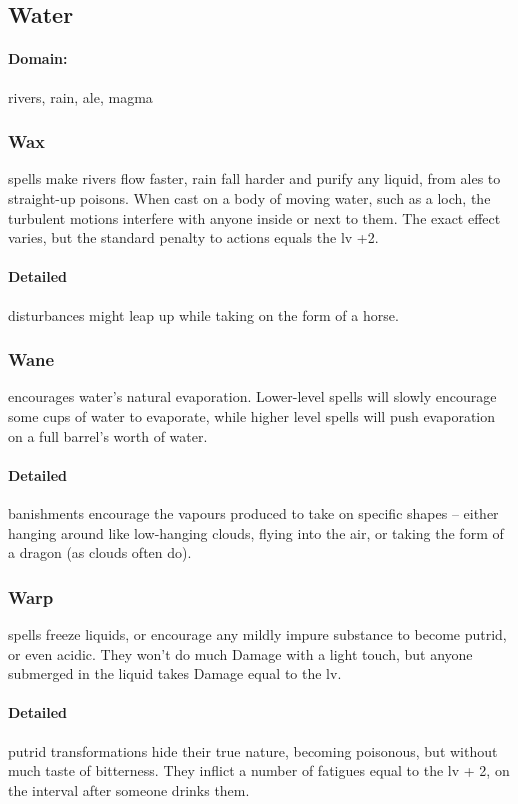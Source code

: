 \begin{multicols}{2}
\subsection{Water}
\paragraph{Domain:}
rivers, rain, ale, magma

\subsubsection{Wax}
spells make rivers flow faster, rain fall harder and purify any liquid, from ales to straight-up poisons.
When cast on a body of moving water, such as a loch, the turbulent motions interfere with anyone inside or next to them.
The exact effect varies, but the standard penalty to actions equals the \gls{lv} +2.

\paragraph{Detailed}
disturbances might leap up while taking on the form of a horse.

\subsubsection{Wane}
encourages water's natural evaporation.
Lower-level spells will slowly encourage some cups of water to evaporate, while higher level spells will push evaporation on a full barrel's worth of water.

\paragraph{Detailed}
banishments encourage the vapours produced to take on specific shapes -- either hanging around like low-hanging clouds, flying into the air, or taking the form of a dragon (as clouds often do).

\subsubsection{Warp}
spells freeze liquids, or encourage any mildly impure substance to become putrid, or even acidic.
They won't do much Damage with a light touch, but anyone submerged in the liquid takes Damage equal to the \gls{lv}.

\paragraph{Detailed}
putrid transformations hide their true nature, becoming poisonous, but without much taste of bitterness.
They inflict a number of \glspl{fatigue} equal to the \gls{lv} + 2, on the \gls{interval} after someone drinks them.


\end{multicols}
